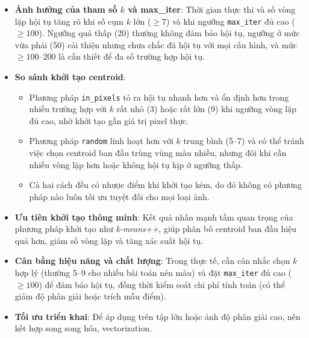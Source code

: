 \begin{itemize}
  \item \textbf{Ảnh hưởng của tham số \(k\) và max\_iter}: Thời gian thực thi và số vòng lặp hội tụ tăng rõ khi số cụm \(k\) lớn (\(\geq7\)) và khi ngưỡng \texttt{max\_iter} đủ cao (\(\geq100\)). Ngưỡng quá thấp (20) thường không đảm bảo hội tụ, ngưỡng ở mức vừa phải (50) cải thiện nhưng chưa chắc đã hội tụ với mọi cấu hình, và mức \(\geq100\)–200 là cần thiết để đa số trường hợp hội tụ.
  \item \textbf{So sánh khởi tạo centroid}:
        \begin{itemize}
          \item Phương pháp \texttt{in\_pixels} tỏ ra hội tụ nhanh hơn và ổn định hơn trong nhiều trường hợp với \(k\) rất nhỏ (3) hoặc rất lớn (9) khi ngưỡng vòng lặp đủ cao, nhờ khởi tạo gần giá trị pixel thực.
          \item Phương pháp \texttt{random} linh hoạt hơn với \(k\) trung bình (5–7) và có thể tránh việc chọn centroid ban đầu trùng vùng màu nhiều, nhưng đôi khi cần nhiều vòng lặp hơn hoặc không hội tụ kịp ở ngưỡng thấp.
          \item Cả hai cách đều có nhược điểm khi khởi tạo kém, do đó không có phương pháp nào luôn tối ưu tuyệt đối cho mọi loại ảnh.
        \end{itemize}
  \item \textbf{Ưu tiên khởi tạo thông minh}: Kết quả nhấn mạnh tầm quan trọng của phương pháp khởi tạo như \emph{k-means++}, giúp phân bố centroid ban đầu hiệu quả hơn, giảm số vòng lặp và tăng xác suất hội tụ.
  \item \textbf{Cân bằng hiệu năng và chất lượng}: Trong thực tế, cần cân nhắc chọn \(k\) hợp lý (thường 5–9 cho nhiều bài toán nén màu) và đặt \texttt{max\_iter} đủ cao (\(\geq 100\)) để đảm bảo hội tụ, đồng thời kiểm soát chi phí tính toán (có thể giảm độ phân giải hoặc trích mẫu điểm).
  \item \textbf{Tối ưu triển khai}: Để áp dụng trên tập lớn hoặc ảnh độ phân giải cao, nên kết hợp song song hóa, vectorization.
\end{itemize}





